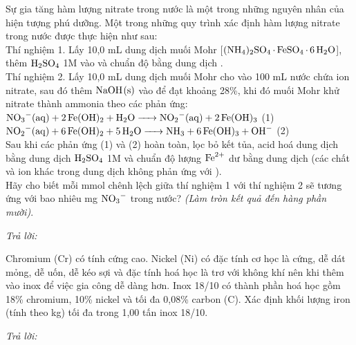 \documentclass[11pt,a4paper]{article}
\begin{document}
\begin{ex}
Sự gia tăng hàm lượng nitrate trong nước là một trong những nguyên nhân của hiện tượng phú dưỡng. Một trong những quy trình xác định hàm lượng nitrate trong nước được thực hiện như sau:\\
Thí nghiệm 1. Lấy 10,0 mL dung dịch muối Mohr [$\ce{(NH4)2SO4.FeSO4.6H2O}$], thêm $\ce{H2SO4}$ 1M vào và chuẩn độ bằng dung dịch .\\
Thí nghiệm 2. Lấy 10,0 mL dung dịch muối Mohr cho vào 100 mL nước chứa ion nitrate, sau đó thêm $\ce{NaOH(s)}$ vào để đạt khoảng 28\%, khi đó muối Mohr khử nitrate thành ammonia theo các phản ứng:\\
$\ce{NO3-(aq) + 2Fe(OH)2 + H2O -> NO2-(aq) + 2Fe(OH)3}$ (1)\\
$\ce{NO2-(aq) + 6Fe(OH)2 + 5H2O -> NH3 + 6Fe(OH)3 + OH-}$ (2)\\
Sau khi các phản ứng (1) và (2) hoàn toàn, lọc bỏ kết tủa, acid hoá dung dịch bằng dung dịch $\ce{H2SO4}$ 1M và chuẩn độ lượng $\ce{Fe^2+}$ dư bằng dung dịch  (các chất và ion khác trong dung dịch không phản ứng với ).\\
Hãy cho biết mỗi mmol  chênh lệch giữa thí nghiệm 1 với thí nghiệm 2 sẽ tương ứng với bao nhiêu mg $\ce{NO3-}$ trong nước? \textit{(Làm tròn kết quả đến hàng phần mười)}.
\loigiai{}
\end{ex}
\noindent\textit{Trả lời:} \dotfill
\vspace{0.2cm}

\begin{ex}
Chromium (Cr) có tính cứng cao. Nickel (Ni) có đặc tính cơ học là cứng, dễ dát mỏng, dễ uốn, dễ kéo sợi và đặc tính hoá học là trơ với không khí nên khi thêm vào inox để việc gia công dễ dàng hơn. Inox 18/10 có thành phần hoá học gồm 18\% chromium, 10\% nickel và tối đa 0,08\% carbon (C). Xác định khối lượng iron (tính theo kg) tối đa trong 1,00 tấn inox 18/10.
\loigiai{}
\end{ex}
\noindent\textit{Trả lời:} \dotfill
\vspace{0.2cm}

\end{document}
